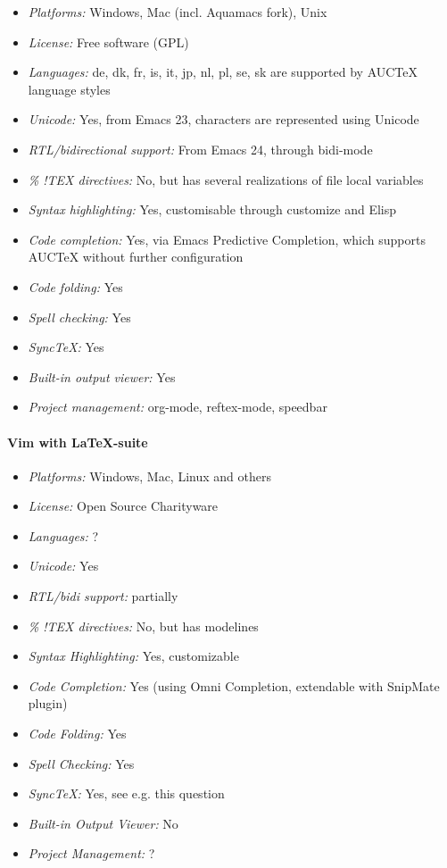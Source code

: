\begin{itemize}
    \item \textit{Platforms:} Windows, Mac (incl. Aquamacs fork), Unix
    \item \textit{License:} Free software (GPL)
    \item \textit{Languages:} de, dk, fr, is, it, jp, nl, pl, se, sk are supported by AUCTeX language styles
    \item \textit{Unicode:} Yes, from Emacs 23, characters are represented using Unicode
    \item \textit{RTL/bidirectional support:} From Emacs 24, through bidi-mode
    \item \textit{\% !TEX directives:} No, but has several realizations of file local variables
    \item \textit{Syntax highlighting:} Yes, customisable through customize and Elisp
    \item \textit{Code completion:} Yes, via Emacs Predictive Completion, which supports AUCTeX without further configuration
    \item \textit{Code folding:} Yes
    \item \textit{Spell checking:} Yes
    \item \textit{SyncTeX:} Yes
    \item \textit{Built-in output viewer:} Yes
    \item \textit{Project management:} org-mode, reftex-mode, speedbar
\end{itemize}

\paragraph{Vim with LaTeX-suite}

\begin{itemize}
    \item \textit{Platforms:} Windows, Mac, Linux and others
    \item \textit{License:} Open Source Charityware
    \item \textit{Languages:} ?
    \item \textit{Unicode:} Yes
    \item \textit{RTL/bidi support:} partially
    \item \textit{\% !TEX directives:} No, but has modelines
    \item \textit{Syntax Highlighting:} Yes, customizable
    \item \textit{Code Completion:} Yes (using Omni Completion, extendable with SnipMate plugin)
    \item \textit{Code Folding:} Yes
    \item \textit{Spell Checking:} Yes
    \item \textit{SyncTeX:} Yes, see e.g. this question
    \item \textit{Built-in Output Viewer:} No
    \item \textit{Project Management:} ?
\end{itemize}

